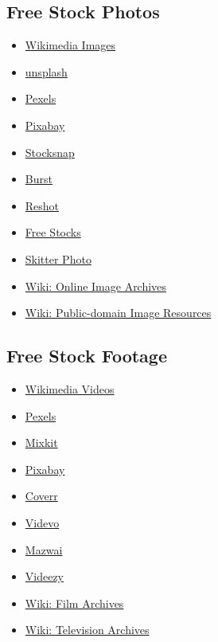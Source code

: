 \hypertarget{rsrc:stockphoto}{\subsection{Free Stock Photos}}
\begin{itemize}
      \item \href{https://commons.wikimedia.org/wiki/Category:Images}{Wikimedia Images}
      \item \href{https://unsplash.com/}{unsplash}
      \item \href{https://www.pexels.com/}{Pexels}
      \item \href{https://pixabay.com/}{Pixabay}
      \item \href{https://stocksnap.io/}{Stocksnap}
      \item \href{https://burst.shopify.com/}{Burst}
      \item \href{https://www.reshot.com/}{Reshot}
      \item \href{https://freestocks.org/}{Free Stocks}
      \item \href{https://skitterphoto.com/}{Skitter Photo}
      \item \href{https://en.wikipedia.org/wiki/List\_of\_online\_image\_archives}{Wiki: Online Image Archives}
      \item \href{https://en.wikipedia.org/wiki/Wikipedia:Public\_domain\_image\_resources}{Wiki: Public-domain Image Resources}
\end{itemize}



\hypertarget{rsrc:stockvideo}{\subsection{Free Stock Footage}}
\begin{itemize}
      \item \href{https://commons.wikimedia.org/wiki/Category:Videos}{Wikimedia Videos}
      \item \href{https://www.pexels.com/videos/}{Pexels}
      \item \href{https://mixkit.co/free-stock-video/}{Mixkit}
      \item \href{https://pixabay.com/videos/}{Pixabay}
      \item \href{https://coverr.co/}{Coverr}
      \item \href{https://www.videvo.net/}{Videvo}
      \item \href{https://mazwai.com/}{Mazwai}
      \item \href{https://www.videezy.com/}{Videezy}
      \item \href{https://en.wikipedia.org/wiki/Category:Film\_archives}{Wiki: Film Archives}
      \item \href{https://en.wikipedia.org/wiki/Category:Television\_archives}{Wiki: Television Archives}
\end{itemize}


